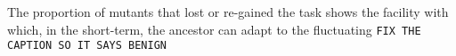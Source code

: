 The proportion of mutants that lost or re-gained the task shows the facility with which, in the short-term, the ancestor can adapt to the fluctuating 
\verb|FIX THE CAPTION SO IT SAYS BENIGN|
